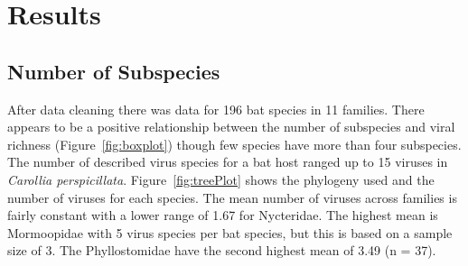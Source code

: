 
\section{Results}





\subsection{Number of Subspecies}


After data cleaning there was data for 196 bat species in 11 families.
There appears to be a positive relationship between the number of subspecies and viral richness (Figure~\ref{fig:boxplot}) though few species have more than four subspecies. 
The number of described virus species for a bat host ranged up to 15 viruses in \emph{Carollia perspicillata}.
Figure~\ref{fig:treePlot} shows the phylogeny used and the number of viruses for each species.
The mean number of viruses across families is fairly constant with a lower range of 1.67 for Nycteridae.
The highest mean is Mormoopidae with 5 virus species per bat species, but this is based on a sample size of 3.
The Phyllostomidae have the second highest mean  of 3.49 (n = 37).



